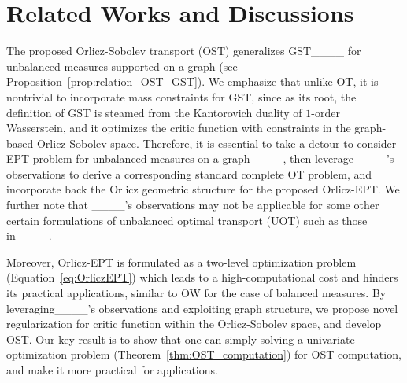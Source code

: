 \section{Related Works and Discussions}
\label{sec:related_works}

The proposed Orlicz-Sobolev transport (OST) generalizes GST____ for unbalanced measures supported on a graph (see Proposition~\ref{prop:relation_OST_GST}). We emphasize that unlike OT, it is nontrivial to incorporate mass constraints for GST, since as its root, the definition of GST is steamed from the Kantorovich duality of $1$-order Wasserstein, and it optimizes the critic function  with constraints in the graph-based Orlicz-Sobolev space. Therefore, it is essential to take a detour to consider EPT problem for unbalanced measures on a graph____, then leverage____'s observations to derive a corresponding standard complete OT problem, and incorporate back the Orlicz geometric structure for the proposed Orlicz-EPT. We further note that ____'s observations may not be applicable for some other certain formulations of unbalanced optimal transport (UOT) such as those in____.


Moreover, Orlicz-EPT is formulated as a two-level optimization problem (Equation~\eqref{eq:OrliczEPT}) which leads to a high-computational cost and hinders its practical applications, similar to OW for the case of balanced measures. By leveraging____'s observations and exploiting graph structure, we propose novel regularization for critic function within the Orlicz-Sobolev space, and develop OST. Our key result is to show that one can simply solving a univariate optimization problem (Theorem~\ref{thm:OST_computation}) for OST computation, and make it more practical for applications. 



